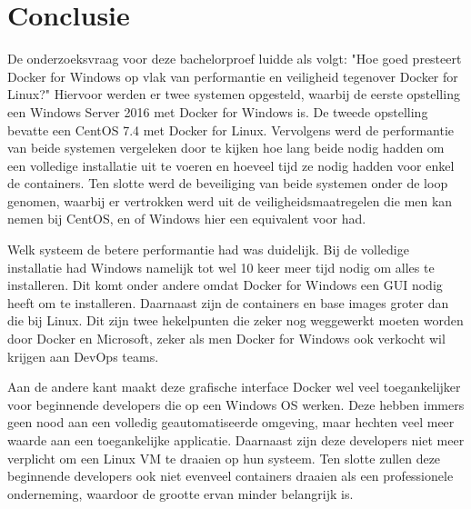 
\chapter{Conclusie}
\label{ch:conclusie}


De onderzoeksvraag voor deze bachelorproef luidde als volgt: "Hoe goed presteert Docker for Windows op vlak van performantie en veiligheid tegenover Docker for Linux?" Hiervoor werden er twee systemen opgesteld, waarbij de eerste opstelling een Windows Server 2016 met Docker for Windows is. De tweede opstelling bevatte een CentOS 7.4 met Docker for Linux. Vervolgens werd de performantie van beide systemen vergeleken door te kijken hoe lang beide nodig hadden om een volledige installatie uit te voeren en hoeveel tijd ze nodig hadden voor enkel de containers. Ten slotte werd de beveiliging van beide systemen onder de loop genomen, waarbij er vertrokken werd uit de veiligheidsmaatregelen die men kan nemen bij CentOS, en of Windows hier een equivalent voor had. 

Welk systeem de betere performantie had was duidelijk. Bij de volledige installatie had Windows namelijk tot wel 10 keer meer tijd nodig om alles te installeren. Dit komt onder andere omdat Docker for Windows een GUI nodig heeft om te installeren. Daarnaast zijn de containers en base images groter dan die bij Linux. Dit zijn twee hekelpunten die zeker nog weggewerkt moeten worden door Docker en Microsoft, zeker als men Docker for Windows ook verkocht wil krijgen aan DevOps teams.

Aan de andere kant maakt deze grafische interface Docker wel veel toegankelijker voor beginnende developers die op een Windows OS werken. Deze hebben immers geen nood aan een volledig geautomatiseerde omgeving, maar hechten veel meer waarde aan een toegankelijke applicatie. Daarnaast zijn deze developers niet meer verplicht om een Linux VM te draaien op hun systeem. Ten slotte zullen deze beginnende developers ook niet evenveel containers draaien als een professionele onderneming, waardoor de grootte ervan minder belangrijk is.

